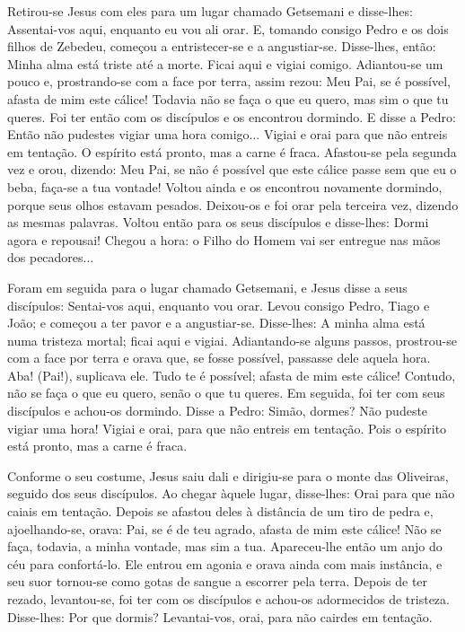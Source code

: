 \documentclass{rosario}
\begin{document}

Retirou-se Jesus com eles para um lugar chamado Getsemani e disse-lhes:
Assentai-vos aqui, enquanto eu vou ali orar.
E, tomando consigo Pedro e os dois filhos de Zebedeu, começou a entristecer-se e a angustiar-se.
Disse-lhes, então:
Minha alma está triste até a morte.
Ficai aqui e vigiai comigo.
Adiantou-se um pouco e, prostrando-se com a face por terra, assim rezou:
Meu Pai, se é possível, afasta de mim este cálice! Todavia não se faça o que eu quero, mas sim o que tu queres.
Foi ter então com os discípulos e os encontrou dormindo.
E disse a Pedro:
Então não pudestes vigiar uma hora comigo...
Vigiai e orai para que não entreis em tentação.
O espírito está pronto, mas a carne é fraca.
Afastou-se pela segunda vez e orou, dizendo:
Meu Pai, se não é possível que este cálice passe sem que eu o beba, faça-se a tua vontade!
Voltou ainda e os encontrou novamente dormindo, porque seus olhos estavam pesados.
Deixou-os e foi orar pela terceira vez, dizendo as mesmas palavras.
Voltou então para os seus discípulos e disse-lhes:
Dormi agora e repousai! Chegou a hora:
o Filho do Homem vai ser entregue nas mãos dos pecadores...


Foram em seguida para o lugar chamado Getsemani, e Jesus disse a seus discípulos:
Sentai-vos aqui, enquanto vou orar.
Levou consigo Pedro, Tiago e João;
e começou a ter pavor e a angustiar-se.
Disse-lhes:
A minha alma está numa tristeza mortal;
ficai aqui e vigiai.
Adiantando-se alguns passos, prostrou-se com a face por terra e orava que, se fosse possível, passasse dele aquela hora.
Aba! (Pai!), suplicava ele.
Tudo te é possível;
afasta de mim este cálice! Contudo, não se faça o que eu quero, senão o que tu queres.
Em seguida, foi ter com seus discípulos e achou-os dormindo.
Disse a Pedro:
Simão, dormes? Não pudeste vigiar uma hora!
Vigiai e orai, para que não entreis em tentação.
Pois o espírito está pronto, mas a carne é fraca.


Conforme o seu costume, Jesus saiu dali e dirigiu-se para o monte das Oliveiras, seguido dos seus discípulos.
Ao chegar àquele lugar, disse-lhes:
Orai para que não caiais em tentação.
Depois se afastou deles à distância de um tiro de pedra e, ajoelhando-se, orava:
Pai, se é de teu agrado, afasta de mim este cálice! Não se faça, todavia, a minha vontade, mas sim a tua.
Apareceu-lhe então um anjo do céu para confortá-lo.
Ele entrou em agonia e orava ainda com mais instância, e seu suor tornou-se como gotas de sangue a escorrer pela terra.
Depois de ter rezado, levantou-se, foi ter com os discípulos e achou-os adormecidos de tristeza.
Disse-lhes:
Por que dormis? Levantai-vos, orai, para não cairdes em tentação.
\end{document}

